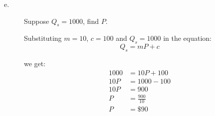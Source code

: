 \documentclass[table]{article}
\begin{document}
\begin{description}
    \item[e.] \begin{Large}Suppose $Q_s = 1000$, find $P$.\end{Large}

        Substituting $m=10$, $c=100$ and $Q_s=1000$ in the equation:
        $$
            Q_s= mP + c
        $$

        we get:
        $$
            \begin{aligned}
                1000 & = 10P + 100      \\
                10P  & = 1000 - 100     \\
                10P  & = 900            \\
                P    & = \frac{900}{10} \\
                P    & = \$ 90          \\
            \end{aligned}
        $$
\end{description}
\end{document}
